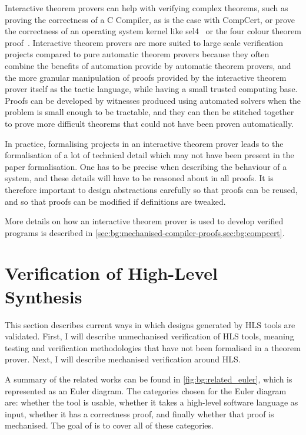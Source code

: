 Interactive theorem provers can help with verifying complex theorems, such as
proving the correctness of a C Compiler, as is the case with CompCert, or prove
the correctness of an operating system kernel like sel4~\cite{klein09_sel4} or
the four colour theorem proof~\cite[]{gonthier08_fp}.  Interactive theorem
provers are more suited to large scale verification projects compared to pure
automatic theorem provers because they often combine the benefits of automation
provide by automatic theorem provers, and the more granular manipulation of
proofs provided by the interactive theorem prover itself as the tactic language,
while having a small trusted computing base.  Proofs can be developed by
witnesses produced using automated solvers when the problem is small enough to
be tractable, and they can then be stitched together to prove more difficult
theorems that could not have been proven automatically.

In practice, formalising projects in an interactive theorem prover leads to the
formalisation of a lot of technical detail which may not have been present in
the paper formalisation.  One has to be precise when describing the behaviour of
a system, and these details will have to be reasoned about in all proofs.  It is
therefore important to design abstractions carefully so that proofs can be
reused, and so that proofs can be modified if definitions are tweaked.

More details on how an interactive theorem prover is used to develop verified
programs is described in
\cref{sec:bg:mechanised-compiler-proofs,sec:bg:compcert}.

\section{Verification of High-Level Synthesis}

This section describes current ways in which designs generated by \gls{HLS}
tools are validated.  First, I will describe unmechanised verification of
\gls{HLS} tools, meaning testing and verification methodologies that have not
been formalised in a theorem prover.  Next, I will describe mechanised
verification around \gls{HLS}.

A summary of the related works can be found in \cref{fig:bg:related_euler},
which is represented as an Euler diagram.  The categories chosen for the Euler
diagram are: whether the tool is usable, whether it takes a high-level software
language as input, whether it has a correctness proof, and finally whether that
proof is mechanised.  The goal of \vericert{} is to cover all of these
categories.

